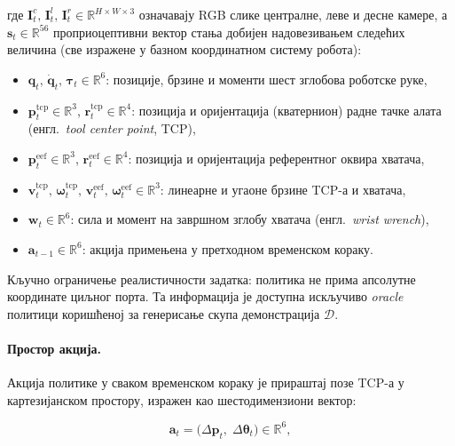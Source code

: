 \documentclass[12pt, a4paper]{article}
\begin{document}
\noindent где $\mathbf{I}_t^{c},\,\mathbf{I}_t^{l},\,\mathbf{I}_t^{r} \in \mathbb{R}^{H \times W \times 3}$ означавају RGB слике централне, леве и десне камере, а $\mathbf{s}_t \in \mathbb{R}^{56}$ проприоцептивни вектор стања добијен надовезивањем следећих величина (све изражене у базном координатном систему робота):

\begin{itemize}
    \item $\mathbf{q}_t,\,\dot{\mathbf{q}}_t,\,\boldsymbol{\tau}_t \in \mathbb{R}^{6}$: позиције, брзине и моменти шест зглобова роботске руке,
    \item $\mathbf{p}_t^{\mathrm{tcp}} \in \mathbb{R}^{3}$, $\mathbf{r}_t^{\mathrm{tcp}} \in \mathbb{R}^{4}$: позиција и оријентација (кватернион) радне тачке алата (енгл.\ \textit{tool center point}, TCP),
    \item $\mathbf{p}_t^{\mathrm{eef}} \in \mathbb{R}^{3}$, $\mathbf{r}_t^{\mathrm{eef}} \in \mathbb{R}^{4}$: позиција и оријентација референтног оквира хватача,
    \item $\mathbf{v}_t^{\mathrm{tcp}},\,\boldsymbol{\omega}_t^{\mathrm{tcp}},\,\mathbf{v}_t^{\mathrm{eef}},\,\boldsymbol{\omega}_t^{\mathrm{eef}} \in \mathbb{R}^{3}$: линеарне и угаоне брзине TCP-а и хватача,
    \item $\mathbf{w}_t \in \mathbb{R}^{6}$: сила и момент на завршном зглобу хватача (енгл.\ \textit{wrist wrench}),
    \item $\mathbf{a}_{t-1} \in \mathbb{R}^{6}$: акција примењена у претходном временском кораку.
\end{itemize}

Кључно ограничење реалистичности задатка: политика не прима апсолутне координате циљног порта.
Та информација је доступна искључиво \textit{oracle} политици коришћеној за генерисање скупа демонстрација $\mathcal{D}$.

\paragraph{Простор акција.}
Акција политике у сваком временском кораку је прираштај позе TCP-а у картезијанском простору, изражен као шестодимензиони вектор:

\begin{equation}
    \mathbf{a}_t = \bigl(\Delta\mathbf{p}_t,\; \Delta\boldsymbol{\theta}_t\bigr) \in \mathbb{R}^6,
    \label{eq:action_space}
\end{equation}
\end{document}
